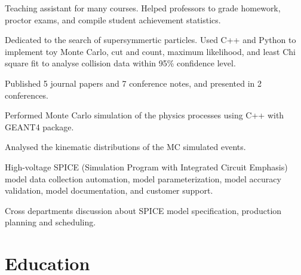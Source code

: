 \documentclass[letterpaper]{deedy-resume-openfont}
\begin{document}
\begin{tightemize}
\item Teaching assistant for many courses. Helped professors to grade homework, proctor exams, and compile student achievement statistics.
\item Dedicated to the search of supersymmertic particles. Used C++ and Python to implement toy Monte Carlo, cut and count, maximum likelihood, and least Chi square fit to analyse collision data within 95\% confidence level.
\item Published 5 journal papers and 7 conference notes, and presented in 2 conferences.
\end{tightemize}
\sectionsep

\begin{tightemize}
\item Performed Monte Carlo simulation of the physics processes using C++ with GEANT4 package.
\item Analysed the kinematic distributions of the MC simulated events.
\end{tightemize}
\sectionsep

\begin{tightemize}
\item High-voltage SPICE (Simulation Program with Integrated Circuit Emphasis) model data collection automation, model parameterization, model accuracy validation, model documentation, and customer support.
\item Cross departments discussion about SPICE model specification, production planning and scheduling.
\end{tightemize}
\sectionsep


\section{Education} 
\end{document}

